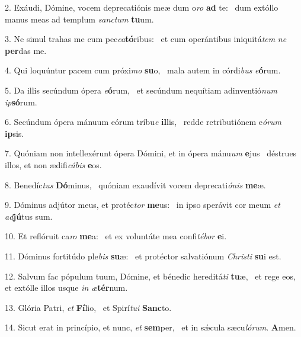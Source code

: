 2. Exáudi, Dómine, vocem deprecatiónis meæ dum o\textit{ro} \textbf{ad} te: \ast\  dum extóllo manus meas ad templum \textit{sanc}\textit{tum} \textbf{tu}um.\

3. Ne simul trahas me cum pec\textit{ca}\textbf{tó}ribus: \ast\  et cum operántibus iniquitá\textit{tem} \textit{ne} \textbf{per}das me.\

4. Qui loquúntur pacem cum próxi\textit{mo} \textbf{su}o, \ast\  mala autem in córdi\textit{bus} \textit{e}\textbf{ó}rum.\

5. Da illis secúndum ópera \textit{e}\textbf{ó}rum, \ast\  et secúndum nequítiam adinventió\textit{num} \textit{ip}\textbf{só}rum.\

6. Secúndum ópera mánuum eórum tríbu\textit{e} \textbf{il}lis, \ast\  redde retributiónem e\textit{ó}\textit{rum} \textbf{ip}sis.\

7. Quóniam non intellexérunt ópera Dómini, et in ópera mánu\textit{um} \textbf{e}jus \ast\  déstrues illos, et non ædifi\textit{cá}\textit{bis} \textbf{e}os.\

8. Benedíc\textit{tus} \textbf{Dó}minus, \ast\  quóniam exaudívit vocem deprecati\textit{ó}\textit{nis} \textbf{me}æ.\

9. Dóminus adjútor meus, et protéc\textit{tor} \textbf{me}us: \ast\  in ipso sperávit cor meum \textit{et} \textit{ad}\textbf{jú}tus sum.\

10. Et reflóruit ca\textit{ro} \textbf{me}a: \ast\  et ex voluntáte mea confi\textit{té}\textit{bor} \textbf{e}i.\

11. Dóminus fortitúdo ple\textit{bis} \textbf{su}æ: \ast\  et protéctor salvatiónum \textit{Chris}\textit{ti} \textbf{su}i est.\

12. Salvum fac pópulum tuum, Dómine, et bénedic hereditá\textit{ti} \textbf{tu}æ, \ast\  et rege eos, et extólle illos usque \textit{in} \textit{æ}\textbf{tér}num.\

13. Glória Patri, \textit{et} \textbf{Fí}lio, \ast\  et Spirí\textit{tu}\textit{i} \textbf{Sanc}to.\

14. Sicut erat in princípio, et nunc, \textit{et} \textbf{sem}per, \ast\  et in sǽcula sæcu\textit{ló}\textit{rum}. \textbf{A}men.\

